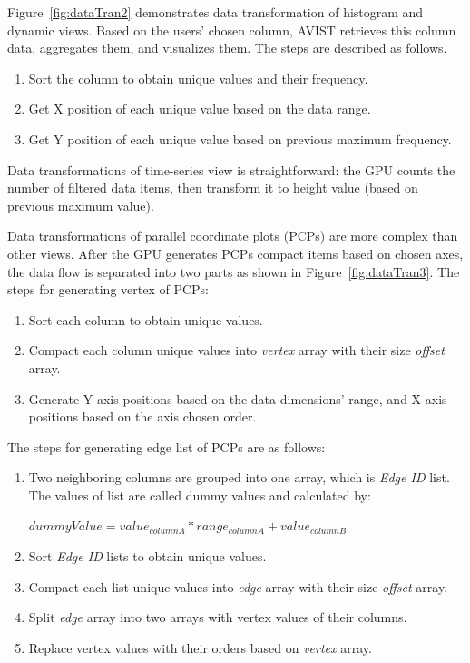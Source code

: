 Figure~\ref{fig:dataTran2} demonstrates data transformation of histogram and dynamic views. Based on the users' chosen column, AVIST retrieves this column data,  aggregates them, and visualizes them. The steps are described as follows. 
\begin{enumerate}[noitemsep]
	\item Sort the  column to obtain unique values and their frequency.
	\item Get X position of each unique value based on the data range.
	\item Get Y position of each unique value based on previous maximum frequency.
\end{enumerate}	

Data transformations of  time-series view is straightforward: the GPU counts the number of  filtered data items, then transform it to height value (based on previous maximum value). 

Data transformations of parallel coordinate plots (PCPs) are more complex than other views. After the GPU generates PCPs compact items based on chosen axes, the data flow is separated into two parts as shown in Figure~\ref{fig:dataTran3}. The steps for generating vertex of PCPs:
\begin{enumerate}[noitemsep]
	\item  Sort each column to obtain unique values.
	\item Compact each column unique values into \textit{vertex} array with their size \textit{offset} array.
	\item Generate Y-axis positions based on the data dimensions' range, and X-axis positions based on the axis chosen order. 
\end{enumerate}

The steps for generating edge list of PCPs are as follows:
\begin{enumerate}[noitemsep]
	\item Two neighboring columns are grouped into one array, which is \textit{Edge ID} list. The values of list are called dummy values and calculated by: 
	
	$dummyValue = value_{columnA}*range_{columnA} + value_{columnB}$
	
	\item  Sort \textit{Edge ID} lists to obtain unique values.
	\item Compact each list unique values into \textit{edge} array with their size \textit{offset} array.
	\item Split \textit{edge} array into two arrays with vertex values of their columns.
	\item Replace vertex values with their orders based on \textit{vertex} array.
	
\end{enumerate}

